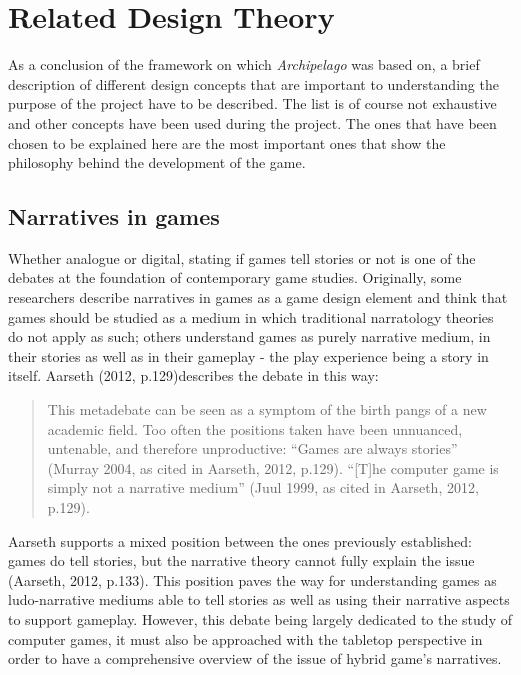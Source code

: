 


\section{Related Design Theory}
As a conclusion of the framework on which \textit{Archipelago} was based on, a brief description of different design concepts that are important to understanding the purpose of the project have to be described. The list is of course not exhaustive and other concepts have been used during the project. The ones that have been chosen to be explained here are the most important ones that show the philosophy behind the development of the game. 
\subsection{Narratives in games}
Whether analogue or digital, stating if games tell stories or not is one of the debates at the foundation of contemporary game studies. Originally, some researchers describe narratives in games as a game design element and think that games should be studied as a medium in which traditional narratology theories do not apply as such; others understand games as purely narrative medium, in their stories as well as in their gameplay - the play experience being a story in itself. Aarseth (2012, p.129)\cite{art:aarseth}describes the debate in this way:
\begin{quotation}
This metadebate can be seen as a symptom of the birth pangs of a new academic field. Too often the positions taken have been unnuanced, untenable, and therefore unproductive: “Games are always stories” (Murray 2004, as cited in Aarseth, 2012, p.129). “[T]he computer game is simply not a narrative medium” (Juul 1999, as cited in Aarseth, 2012, p.129).
\end{quotation}
Aarseth supports a mixed position between the ones previously established: games do tell stories, but the narrative theory cannot fully explain the issue (Aarseth, 2012, p.133). This position paves the way for understanding games as ludo-narrative mediums able to tell stories as well as using their narrative aspects to support gameplay. However, this debate being largely dedicated to the study of computer games, it must also be approached with the tabletop perspective in order to have a comprehensive overview of the issue of hybrid game's narratives.


